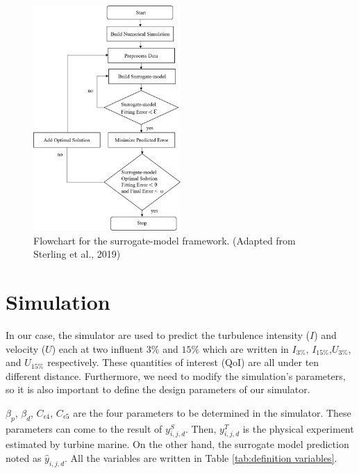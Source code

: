 
\begin{figure}[h]
	\centering
	\includegraphics[width=0.5\textwidth]{images/flow.png}
	\caption{Flowchart for the surrogate-model framework. (Adapted from Sterling et al., 2019)}
	\label{Flowchart for the surrogate-model framework}
\end{figure}
\section{Simulation}
In our case, the simulator are used to predict the turbulence intensity ($I$) and velocity ($U$) each at two influent ${3\%}$ and ${15\%}$ which are written in $I_{3\%}$, $I_{15\%}$,$U_{3\%}$, and $U_{15\%}$ respectively. These quantities of interest (QoI) are all under ten different distance. Furthermore, we need to modify the simulation's parameters, so it is also important to define the design parameters of our simulator.
 
$\beta_{p}$, $\beta_{d}$, $C_{\epsilon4}$, $C_{\epsilon5}$ are the four parameters to be determined in the simulator. These parameters can come to the result of $y_{i,j,d}^S$. Then, $y_{i,j,d}^T$ is the physical experiment estimated by turbine marine. On the other hand, the surrogate model prediction noted as $\hat{y}_{i,j,d}$. All the variables are written in Table \ref{tab:definition variables}.

